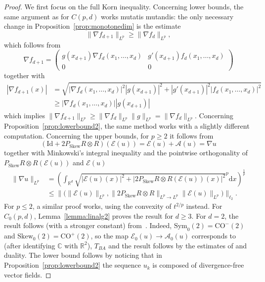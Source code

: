 \documentclass[11pt, a4paper]{amsart}
\theoremstyle{definition}
\theoremstyle{remark}
\newcommand{\R}{\mathbb{R}}
\newcommand{\C}{\mathbb{C}}
\begin{document}
\begin{proof}
We first focus on the full Korn inequality.
Concerning lower bounds,
the same argument as for $C(p,d)$ works
mutatis mutandis: the only necessary change in
Proposition~\ref{prop:monotonedim} is the estimate
\begin{equation*}
\|\nabla f_{d+1}\|_{L^p}\ge \|\nabla f_d\|_{L^p},
\end{equation*}
which follows from
\begin{equation*}
\nabla f_{d+1}=
\begin{pmatrix}g(x_{d+1})\nabla f_d(x_1,\dots, x_d)
& g'(x_{d+1})f_d(x_1,\dots, x_d)\\
0&0\end{pmatrix}
\end{equation*}
together with
\begin{align*}
|\nabla f_{d+1}(x)|
&=
\sqrt{|\nabla f_d(x_1,\dots, x_{d})|^2|g(x_{d+1})|^2
+|g'(x_{d+1})|^2|f_d
(x_1,\dots, x_d)|^2}\\&
\ge|\nabla f_d(x_1,\dots, x_{d})||g(x_{d+1})|
\end{align*}
which implies
$\|\nabla f_{d+1}\|_{L^p}
\ge \|\nabla f_d\|_{L^p}\|g\|_{L^p}
=\|\nabla f_d\|_{L^p}$.
Concerning Proposition~\ref{prop:lowerbound2},
the same method works with a slightly
different computation. Concerning the upper bounds, 
for $p\ge 2$ it follows from
\begin{equation*}
(\mathrm{Id}+2P_{\mathrm{Skew}}R\otimes R)
(\mathcal E(u))
=\mathcal E(u)+\mathcal A(u)=\nabla u
\end{equation*}
together with Minkowski's integral inequality and
the pointwise orthogonality of
$P_{\mathrm{Skew}}R\otimes R(\mathcal E(u))$
and $\mathcal E(u)$
\begin{align*}
\|\nabla u\|_{L^p}
&=
\left(
\int_{\R^d} \sqrt{|\mathcal E(u)(x)|^2
+|2P_{\mathrm{Skew}}R\otimes R
(\mathcal E(u))(x)|^2}^p\mathrm{d}x
\right)^{\frac 1p}
\\&\le
\Big\|\big(\|\mathcal E(u)\|_{L^p},\|2P_{\mathrm{Skew}}
R\otimes R\|_{L^p\to L^p}
\|\mathcal E(u)\|_{L^p}\big)\Big\|_{\ell_2}.
\end{align*}
For $p\le 2$, a similar proof works,
using the convexity of $t^{2/p}$ instead.
For $C_0(p,d)$, Lemma~\ref{lemma:linalg2}
proves the result for $d\ge 3$. For $d=2$,
the result follows (with a stronger constant)
from~\cite{Volberg}. Indeed, $\mathrm{Sym}_0(2)
=\mathrm{CO}^-(2)$ and $\mathrm{Skew}_0(2)=
\mathrm{CO}^+(2)$, so the map
$\mathcal E_0(u)\to \mathcal A_0(u)$
corresponds
to (after identifying $\C$ with $\R^2$), 
$T_{BA}$ and the result follows by
the estimates of \cite{Volberg} and duality.
The lower bound follows by 
noticing that in Proposition~\ref{prop:lowerbound2}
the sequence $u_k$ is composed
of divergence-free vector fields. 
\end{proof}
\end{document}

